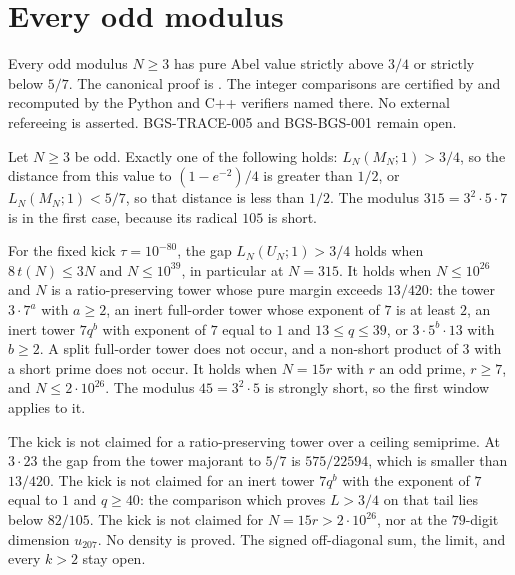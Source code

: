 \section{Every odd modulus}
\label{sec:odd-modulus-abel}
Every odd modulus \(N\ge3\) has pure Abel value strictly above \(3/4\) or
strictly below \(5/7\). The canonical proof is
.
The integer comparisons are certified by
 and recomputed by the
Python and C++ verifiers named there. No external refereeing is asserted.
BGS-TRACE-005 and BGS-BGS-001 remain open.

\begin{theorem}
\label{thm:odd-modulus-abel}
Let \(N\ge3\) be odd. Exactly one of the following holds:
\(L_N(M_N;1)>3/4\), so the distance from this value to
\((1-e^{-2})/4\) is greater than \(1/2\), or
\(L_N(M_N;1)<5/7\), so that distance is less than \(1/2\).
The modulus \(315=3^2\cdot5\cdot7\) is in the first case, because its
radical \(105\) is short.

For the fixed kick \(\tau=10^{-80}\), the gap \(L_N(U_N;1)>3/4\) holds
when \(8\,t(N)\le3N\) and \(N\le10^{39}\), in particular at \(N=315\).
It holds when \(N\le10^{26}\) and \(N\) is a ratio-preserving tower whose
pure margin exceeds \(13/420\): the tower \(3\cdot7^a\) with \(a\ge2\), an
inert full-order tower whose exponent of \(7\) is at least \(2\), an inert
tower \(7q^b\) with exponent of \(7\) equal to \(1\) and
\(13\le q\le39\), or \(3\cdot5^b\cdot13\) with \(b\ge2\). A split
full-order tower does not occur, and a non-short product of \(3\) with a
short prime does not occur. It holds when
\(N=15r\) with \(r\) an odd prime, \(r\ge7\), and \(N\le2\cdot10^{26}\).
The modulus \(45=3^2\cdot5\) is strongly short, so the first window applies
to it.

The kick is not claimed for a ratio-preserving tower over a ceiling
semiprime. At \(3\cdot23\) the gap from the tower majorant to \(5/7\) is
\(575/22594\), which is smaller than \(13/420\). The kick is not claimed
for an inert tower \(7q^b\) with the exponent of \(7\) equal to \(1\) and
\(q\ge40\): the comparison which proves \(L>3/4\) on that tail lies below
\(82/105\). The kick is not claimed for \(N=15r>2\cdot10^{26}\), nor at
the \(79\)-digit dimension \(u_{207}\). No density is proved. The signed
off-diagonal sum, the limit, and every \(k>2\) stay open.
\end{theorem}
